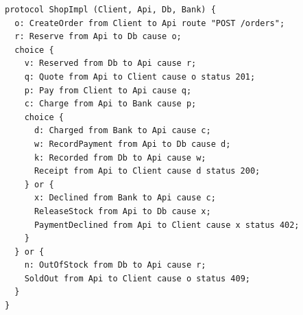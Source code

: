 \begin{lstlisting}[language={},basicstyle=\ttfamily\footnotesize,breaklines=true]
protocol ShopImpl (Client, Api, Db, Bank) {
  o: CreateOrder from Client to Api route "POST /orders";
  r: Reserve from Api to Db cause o;
  choice {
    v: Reserved from Db to Api cause r;
    q: Quote from Api to Client cause o status 201;
    p: Pay from Client to Api cause q;
    c: Charge from Api to Bank cause p;
    choice {
      d: Charged from Bank to Api cause c;
      w: RecordPayment from Api to Db cause d;
      k: Recorded from Db to Api cause w;
      Receipt from Api to Client cause d status 200;
    } or {
      x: Declined from Bank to Api cause c;
      ReleaseStock from Api to Db cause x;
      PaymentDeclined from Api to Client cause x status 402;
    }
  } or {
    n: OutOfStock from Db to Api cause r;
    SoldOut from Api to Client cause o status 409;
  }
}
\end{lstlisting}
